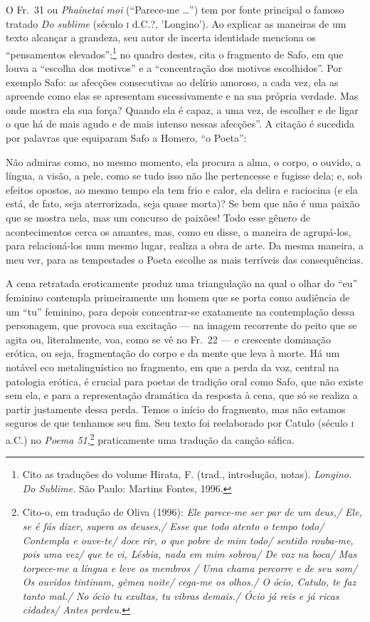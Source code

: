 {\small O Fr.~31 ou \textit{Phaínetaí moi} (“Parece-me \ldots{}”) tem por fonte
principal o famoso tratado \textit{Do sublime} (século \textsc{i} d.C.?, 'Longino'). Ao
explicar as maneiras de um texto alcançar a grandeza, seu autor de incerta identidade menciona os
“pensamentos elevados”;\footnote{ Cito as traduções do volume Hirata,
F. (trad., introdução, notas). \textit{Longino.} \textit{Do Sublime.} São
Paulo: Martins Fontes, 1996.} no quadro destes, cita o fragmento de Safo,
em que louva a “escolha dos motivos” e a “concentração dos
motivos escolhidos”. Por exemplo Safo: as afecções consecutivas ao delírio
amoroso, a cada vez, ela as apreende como elas se apresentam sucessivamente e
na sua própria verdade. Mas onde mostra ela sua força? Quando ela é capaz, a
uma vez, de escolher e de ligar o que há de mais agudo e de mais
intenso nessas afecções”. A citação é sucedida por palavras que equiparam Safo
a Homero, “o Poeta”: 

\begin{hedraquote}
Não admiras como, no mesmo momento, ela
procura a alma, o corpo, o ouvido, a língua, a visão, a pele, como se tudo isso
não lhe pertencesse e fugisse dela; e, sob efeitos opostos, ao mesmo tempo ela
tem frio e calor, ela delira e raciocina (e ela está, de fato, seja
aterrorizada, seja quase morta)? Se bem que não é uma paixão que se mostra
nela, mas um concurso de paixões! Todo esse gênero de acontecimentos cerca os
amantes, mas, como eu disse, a maneira de agrupá-los, para relacioná-los num
mesmo lugar, realiza a obra de arte. Da mesma maneira, a meu ver, para as
tempestades o Poeta escolhe as mais terríveis das consequências.
\end{hedraquote}

A cena retratada eroticamente produz uma triangulação na qual o olhar do “eu”
feminino contempla primeiramente um homem que se porta como audiência de um
“tu” feminino, para depois concentrar-se exatamente na contemplação dessa
personagem, que provoca sua excitação --- na imagem recorrente do peito que se agita ou,
literalmente, voa, como se vê no Fr.~22 --- e crescente dominação erótica, ou
seja, fragmentação do corpo e da mente que leva à morte. Há um notável eco
metalinguístico no fragmento, em que a perda da voz, central na patologia
erótica, é crucial para poetas de tradição oral como Safo, que não existe sem
ela, e para a representação dramática da resposta à cena, que só se realiza a
partir justamente dessa perda. Temos o início do fragmento, mas não estamos
seguros de que tenhamos seu fim. Seu texto foi reelaborado por Catulo (século \textsc{i}
a.C.) no \textit{Poema 51},\footnote{ Cito-o, em tradução de Oliva (1996):
\textit{Ele parece-me ser par de um deus,/ Ele, se é fás dizer, supera os
deuses,/ Esse que todo atento o tempo todo/ Contempla e ouve-te/ doce rir, o
que pobre de mim todo/ sentido rouba-me, pois uma vez/ que te vi, Lésbia,
nada em mim sobrou/ De voz na boca/ Mas torpece-me a língua e leve os membros
/ Uma chama percorre e de seu som/ Os ouvidos tintinam, gêmea noite/ cega-me
os olhos./ O ócio, Catulo, te faz tanto mal./ No ócio tu exultas, tu vibras
demais./ Ócio já reis e já ricas cidades/ Antes perdeu.}} praticamente uma
tradução da canção sáfica.}

